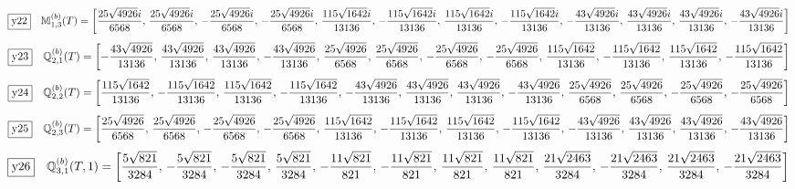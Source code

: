 \documentclass[fleqn,10pt,landscape]{jsarticle}
\begin{document}
\begin{dmath*}
\fbox{y22}\quad \mathbb{M}_{1,3}^{(b)}(T)=\left[ \frac{25 \sqrt{4926} i}{6568},\, \frac{25 \sqrt{4926} i}{6568},\, - \frac{25 \sqrt{4926} i}{6568},\, - \frac{25 \sqrt{4926} i}{6568},\, \frac{115 \sqrt{1642} i}{13136},\, - \frac{115 \sqrt{1642} i}{13136},\, \frac{115 \sqrt{1642} i}{13136},\, - \frac{115 \sqrt{1642} i}{13136},\, - \frac{43 \sqrt{4926} i}{13136},\, \frac{43 \sqrt{4926} i}{13136},\, \frac{43 \sqrt{4926} i}{13136},\, - \frac{43 \sqrt{4926} i}{13136} \right]
\end{dmath*}
\begin{dmath*}
\fbox{y23}\quad \mathbb{Q}_{2,1}^{(b)}(T)=\left[ - \frac{43 \sqrt{4926}}{13136},\, \frac{43 \sqrt{4926}}{13136},\, \frac{43 \sqrt{4926}}{13136},\, - \frac{43 \sqrt{4926}}{13136},\, \frac{25 \sqrt{4926}}{6568},\, \frac{25 \sqrt{4926}}{6568},\, - \frac{25 \sqrt{4926}}{6568},\, - \frac{25 \sqrt{4926}}{6568},\, \frac{115 \sqrt{1642}}{13136},\, - \frac{115 \sqrt{1642}}{13136},\, \frac{115 \sqrt{1642}}{13136},\, - \frac{115 \sqrt{1642}}{13136} \right]
\end{dmath*}
\begin{dmath*}
\fbox{y24}\quad \mathbb{Q}_{2,2}^{(b)}(T)=\left[ \frac{115 \sqrt{1642}}{13136},\, - \frac{115 \sqrt{1642}}{13136},\, \frac{115 \sqrt{1642}}{13136},\, - \frac{115 \sqrt{1642}}{13136},\, - \frac{43 \sqrt{4926}}{13136},\, \frac{43 \sqrt{4926}}{13136},\, \frac{43 \sqrt{4926}}{13136},\, - \frac{43 \sqrt{4926}}{13136},\, \frac{25 \sqrt{4926}}{6568},\, \frac{25 \sqrt{4926}}{6568},\, - \frac{25 \sqrt{4926}}{6568},\, - \frac{25 \sqrt{4926}}{6568} \right]
\end{dmath*}
\begin{dmath*}
\fbox{y25}\quad \mathbb{Q}_{2,3}^{(b)}(T)=\left[ \frac{25 \sqrt{4926}}{6568},\, \frac{25 \sqrt{4926}}{6568},\, - \frac{25 \sqrt{4926}}{6568},\, - \frac{25 \sqrt{4926}}{6568},\, \frac{115 \sqrt{1642}}{13136},\, - \frac{115 \sqrt{1642}}{13136},\, \frac{115 \sqrt{1642}}{13136},\, - \frac{115 \sqrt{1642}}{13136},\, - \frac{43 \sqrt{4926}}{13136},\, \frac{43 \sqrt{4926}}{13136},\, \frac{43 \sqrt{4926}}{13136},\, - \frac{43 \sqrt{4926}}{13136} \right]
\end{dmath*}
\begin{dmath*}
\fbox{y26}\quad \mathbb{Q}_{3,1}^{(b)}(T,1)=\left[ \frac{5 \sqrt{821}}{3284},\, - \frac{5 \sqrt{821}}{3284},\, - \frac{5 \sqrt{821}}{3284},\, \frac{5 \sqrt{821}}{3284},\, - \frac{11 \sqrt{821}}{821},\, - \frac{11 \sqrt{821}}{821},\, \frac{11 \sqrt{821}}{821},\, \frac{11 \sqrt{821}}{821},\, \frac{21 \sqrt{2463}}{3284},\, - \frac{21 \sqrt{2463}}{3284},\, \frac{21 \sqrt{2463}}{3284},\, - \frac{21 \sqrt{2463}}{3284} \right]
\end{dmath*}
\end{document}
